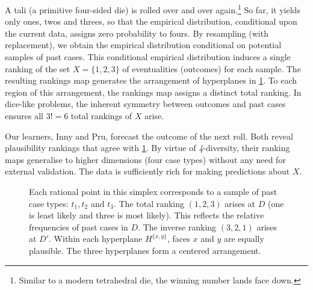 \documentclass[12pt,a4paper,twoside]{article}
\newcommand{\fourdiv}{\textit{4}-\textup{diversity}}
\begin{document}
\begin{example}[A setting where \fourdiv\ holds]\label{eg-tali}
  A tali (a primitive four-sided die) is rolled over and over
  again.\footnote{Similar to a modern tetrahedral die, the winning number lands
  face down.} So far, it yields only ones, twos and threes, so that the
  empirical distribution, conditional upon the current data, assigns zero
  probability to fours. By resampling (with replacement), we obtain the
  empirical distribution conditional on potential samples of past cases. This
  conditional empirical distribution induces a single ranking of the set
  $X=\{1, 2, 3\}$ of eventualities (outcomes) for each sample. The resulting
  rankings map generates the arrangement of hyperplanes in \cref{fig-tali}.  To
  each region of this arrangement, the rankings map assigns a distinct
  total ranking.  
  In dice-like problems, the inherent symmetry between outcomes and past cases
  ensures all $3!=6$ total rankings of $X$ arise.

 
  Our learners, Inny and {Pru}, forecast the outcome of the next roll.  Both
  reveal plausibility rankings that agree with \cref{fig-tali}. By virtue of
  \fourdiv, their ranking maps generalise to higher dimensions (four case
  types) without any need for external validation. The data is sufficiently
  rich for making predictions about $X$.
\end{example}
\begin{figure}
  \centering 

  \caption{\label{fig-tali} Each rational point in this simplex corresponds to
  a sample of past case types: $t_1, t_2$ and $t_3$.  The total
  ranking $(1, 2, 3)$ arises at $D$ (one is least likely and three is most
  likely). This reflects the relative frequencies of past cases in $D$.  The
  inverse ranking $(3, 2, 1)$ arises at $D'$. Within each hyperplane $H^{\{x,
  y\}}$, faces $x$ and $y$ are equally plausible.  The three hyperplanes form a
  centered arrangement.}
\end{figure}
\end{document}
